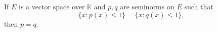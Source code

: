 If $E$ is a vector space over $\mathbb{K}$ and $p, q$ are seminorms on $E$ such that
$$\{x : p(x) \leq 1\} = \{x : q(x) \leq 1\},$$
then $p = q$.
